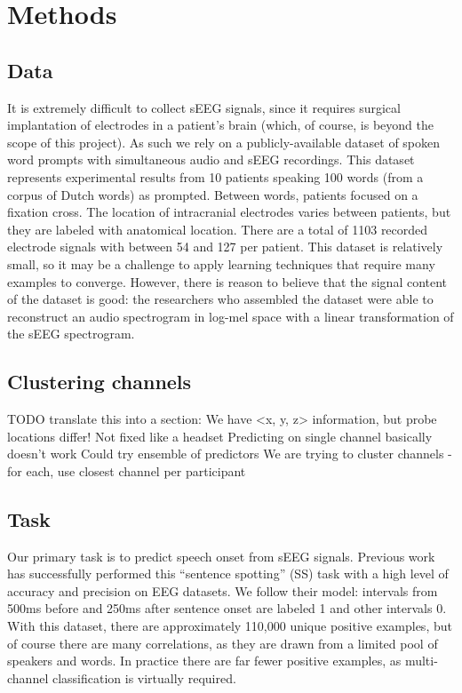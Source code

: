 \documentclass[format=sigconf, nonacm=true, review=true, screen=true]{acmart}
\begin{document}
\section{Methods}

\subsection{Data}

It is extremely difficult to collect sEEG signals, since it requires surgical implantation of electrodes in a patient's brain (which, of course, is beyond the scope of this project). As such we rely on a publicly-available dataset of spoken word prompts with simultaneous audio and sEEG recordings. \cite{verwoert2022dataset} This dataset represents experimental results from 10 patients speaking 100 words (from a corpus of Dutch words) as prompted. Between words, patients focused on a fixation cross. The location of intracranial electrodes varies between patients, but they are labeled with anatomical location. There are a total of 1103 recorded electrode signals with between 54 and 127 per patient. This dataset is relatively small, so it may be a challenge to apply learning techniques that require many examples to converge. However, there is reason to believe that the signal content of the dataset is good: the researchers who assembled the dataset were able to reconstruct an audio spectrogram in log-mel space with a linear transformation of the sEEG spectrogram.

\subsection{Clustering channels}

TODO translate this into a section:
We have <x, y, z> information, but probe locations differ!
Not fixed like a headset
Predicting on single channel basically doesn't work
Could try ensemble of predictors
We are trying to cluster channels - for each, use closest channel per participant

\subsection{Task}

Our primary task is to predict speech onset from sEEG signals. Previous work has successfully performed this ``sentence spotting'' (SS) task with a high level of accuracy and precision on EEG datasets. \cite{sakthi2021keyword} We follow their model: intervals from 500ms before and 250ms after sentence onset are labeled 1 and other intervals 0. With this dataset, there are approximately 110,000 unique positive examples, but of course there are many correlations, as they are drawn from a limited pool of speakers and words. In practice there are far fewer positive examples, as multi-channel classification is virtually required.
\end{document}
